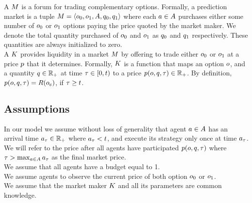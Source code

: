 A  $M$ is a forum for trading complementary options. 
Formally, a prediction market is a tuple $M = 
\left<o_0, o_1, A, {q_0}, {q_1}\right>$ where each  
$a\in A$ purchases 
either some number of $o_0$ or $o_1$ options paying the price quoted by the 
market maker. We denote the total quantity purchased of $o_0$ and $o_1$
as ${q_0}$ and ${q_1}$ respectively. These quantities are always initialized to zero. \\

A  $K$ provides liquidity in a market $M$ by
offering to trade either $o_0$ or $o_1$ at a price $p$ that it determines. 
Formally, $K$ is a function 
that maps an option $o$, 
and a quantity $q\in\mathbb{R}_+$ at time $\tau \in [0,t)$ 
to a price $p(o,q,\tau) \in \mathbb{R}_+$. 
By definition, $p(o,q,\tau) = R(o_e)$, if 
$\tau \ge t$. \\


\subsection{Assumptions}

In our model we assume without loss of generality that agent $a \in A$ has an arrival time 
$a_\tau \in \mathbb{R}_+$ where $a_\tau < t$, 
and execute its strategy only once at time $a_\tau$. We will refer to the price after all agents have participated $p(o,q,\tau)$ where $\tau > \max_{a \in A} a_\tau$ as the final market price.\\

We assume that all agents have a budget equal to 1.\\

We assume agents to observe the current price of both option $o_0$ or $o_1$.\\

We assume that the market maker $K$ and all its parameters are common knowledge.\\

